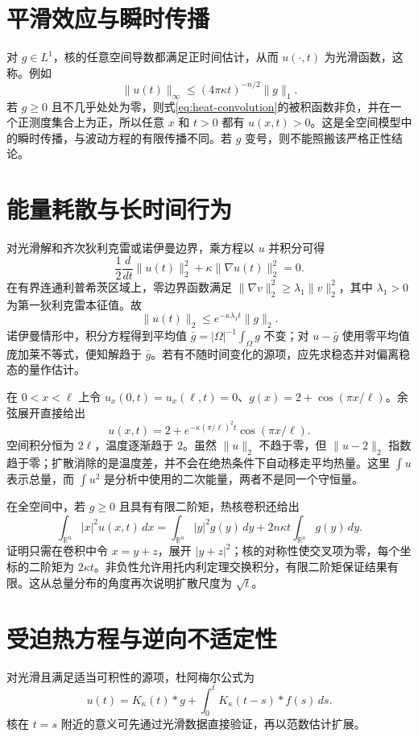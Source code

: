 \documentclass[UTF8,12pt,a4paper,fontset=fandol]{ctexbook}
\begin{document}
\section{平滑效应与瞬时传播}
对 $g\in L^1$，核的任意空间导数都满足正时间估计，从而 $u(\cdot,t)$ 为光滑函数，这称。例如
\[
 \|u(t)\|_\infty\le(4\pi\kappa t)^{-n/2}\|g\|_1.
\]
若 $g\ge0$ 且不几乎处处为零，则式\eqref{eq:heat-convolution}的被积函数非负，并在一个正测度集合上为正，所以任意 $x$ 和 $t>0$ 都有 $u(x,t)>0$。这是全空间模型中的瞬时传播，与波动方程的有限传播不同。若 $g$ 变号，则不能照搬该严格正性结论。

\section{能量耗散与长时间行为}
对光滑解和齐次狄利克雷或诺伊曼边界，乘方程以 $u$ 并积分可得
\begin{equation}
 \frac12\frac d{dt}\|u(t)\|_2^2+\kappa\|\nabla u(t)\|_2^2=0.
 \label{eq:heat-energy}
\end{equation}
在有界连通利普希茨区域上，零边界函数满足 $\|\nabla v\|_2^2\ge\lambda_1\|v\|_2^2$，其中 $\lambda_1>0$ 为第一狄利克雷本征值。故
\[
 \|u(t)\|_2\le e^{-\kappa\lambda_1t}\|g\|_2.
\]
诺伊曼情形中，积分方程得到平均值 $\bar g=|\Omega|^{-1}\int_\Omega g$ 不变；对 $u-\bar g$ 使用零平均值庞加莱不等式，便知解趋于 $\bar g$。若有不随时间变化的源项，应先求稳态并对偏离稳态的量作估计。

\begin{example}[绝热杆的长期温度]
在 $0<x<\ell$ 上令 $u_x(0,t)=u_x(\ell,t)=0$、$g(x)=2+\cos(\pi x/\ell)$。余弦展开直接给出
\[
 u(x,t)=2+e^{-\kappa(\pi/\ell)^2t}\cos(\pi x/\ell).
\]
空间积分恒为 $2\ell$，温度逐渐趋于 $2$。虽然 $\|u\|_2$ 不趋于零，但 $\|u-2\|_2$ 指数趋于零；扩散消除的是温度差，并不会在绝热条件下自动移走平均热量。这里 $\int u$ 表示总量，而 $\int u^2$ 是分析中使用的二次能量，两者不是同一个守恒量。
\end{example}

在全空间中，若 $g\ge0$ 且具有有限二阶矩，热核卷积还给出
\[
 \int_{\mathbb R^n}|x|^2u(x,t)\,dx
 =\int_{\mathbb R^n}|y|^2g(y)\,dy+2n\kappa t\int_{\mathbb R^n}g(y)\,dy.
\]
证明只需在卷积中令 $x=y+z$，展开 $|y+z|^2$；核的对称性使交叉项为零，每个坐标的二阶矩为 $2\kappa t$。非负性允许用托内利定理交换积分，有限二阶矩保证结果有限。这从总量分布的角度再次说明扩散尺度为 $\sqrt t$。

\section{受迫热方程与逆向不适定性}
对光滑且满足适当可积性的源项，杜阿梅尔公式为
\[
 u(t)=K_\kappa(t)*g+\int_0^t K_\kappa(t-s)*f(s)\,ds.
\]
核在 $t=s$ 附近的意义可先通过光滑数据直接验证，再以范数估计扩展。
\end{document}
